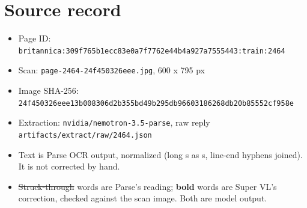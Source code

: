 \documentclass[10pt]{article}
\begin{document}
\section*{Source record}
\begin{itemize}
\item Page ID: \texttt{britannica:309f765b1ecc83e0a7f7762e44b4a927a7555443:train:2464}
\item Scan: \texttt{page-2464-24f450326eee.jpg}, 600 x 795 px
\item Image SHA-256: \texttt{\small 24f450326eee13b008306d2b355bd49b295db96603186268db20b85552cf958e}
\item Extraction: \texttt{nvidia/nemotron-3.5-parse}, raw reply \texttt{artifacts/extract/raw/2464.json}
\item Text is Parse OCR output, normalized (long s as s, line-end hyphens joined). It is not corrected by hand.
\item \sout{Struck-through} words are Parse's reading; \textbf{bold} words are Super VL's correction, checked against the scan image. Both are model output.
\end{itemize}
\end{document}
